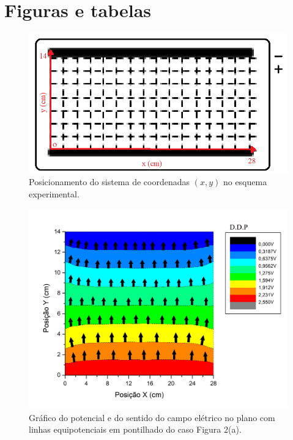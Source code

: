 \section{Figuras e tabelas}
\begin{figure}[ht!]
\centering
\includegraphics[width = 9 cm]{figuras/fig1.png}
\caption{\small{Posicionamento do sistema de coordenadas $(x,y)$ no esquema experimental.}}
\label{fig:1}
\end{figure}


\begin{figure}[ht!]
\centering
\includegraphics[width = 9 cm]{figuras/Graph5.png}
\caption{\small{Gráfico do potencial e do sentido do campo elétrico no plano com linhas equipotenciais em pontilhado do caso Figura 2(a).}}
\label{fig:2}
\end{figure}

